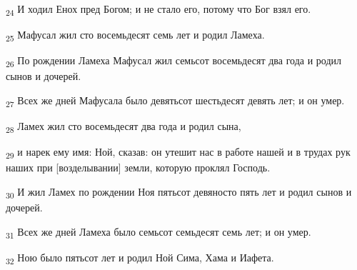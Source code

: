 \begin{tcolorbox}
\textsubscript{24} И ходил Енох пред Богом; и не стало его, потому что Бог взял его.
\end{tcolorbox}
\begin{tcolorbox}
\textsubscript{25} Мафусал жил сто восемьдесят семь лет и родил Ламеха.
\end{tcolorbox}
\begin{tcolorbox}
\textsubscript{26} По рождении Ламеха Мафусал жил семьсот восемьдесят два года и родил сынов и дочерей.
\end{tcolorbox}
\begin{tcolorbox}
\textsubscript{27} Всех же дней Мафусала было девятьсот шестьдесят девять лет; и он умер.
\end{tcolorbox}
\begin{tcolorbox}
\textsubscript{28} Ламех жил сто восемьдесят два года и родил сына,
\end{tcolorbox}
\begin{tcolorbox}
\textsubscript{29} и нарек ему имя: Ной, сказав: он утешит нас в работе нашей и в трудах рук наших при [возделывании] земли, которую проклял Господь.
\end{tcolorbox}
\begin{tcolorbox}
\textsubscript{30} И жил Ламех по рождении Ноя пятьсот девяносто пять лет и родил сынов и дочерей.
\end{tcolorbox}
\begin{tcolorbox}
\textsubscript{31} Всех же дней Ламеха было семьсот семьдесят семь лет; и он умер.
\end{tcolorbox}
\begin{tcolorbox}
\textsubscript{32} Ною было пятьсот лет и родил Ной Сима, Хама и Иафета.
\end{tcolorbox}
